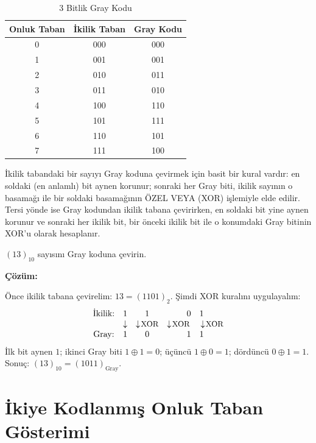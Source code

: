 \begin{table}[H]
\centering
\caption{3 Bitlik Gray Kodu}
\label{tab:gray-kodu}
\begin{tabular}{ccc}
\toprule
\textbf{Onluk Taban} & \textbf{İkilik Taban} & \textbf{Gray Kodu} \\
\midrule
0 & 000 & 000 \\
1 & 001 & 001 \\
2 & 010 & 011 \\
3 & 011 & 010 \\
4 & 100 & 110 \\
5 & 101 & 111 \\
6 & 110 & 101 \\
7 & 111 & 100 \\
\bottomrule
\end{tabular}
\end{table}

İkilik tabandaki bir sayıyı Gray koduna çevirmek için basit bir kural vardır: en soldaki (en anlamlı) bit aynen korunur; sonraki her Gray biti, ikilik sayının o basamağı ile bir soldaki basamağının ÖZEL VEYA (XOR) işlemiyle elde edilir. Tersi yönde ise Gray kodundan ikilik tabana çevirirken, en soldaki bit yine aynen korunur ve sonraki her ikilik bit, bir önceki ikilik bit ile o konumdaki Gray bitinin XOR'u olarak hesaplanır.

\begin{ornek}[A.21]
$(13)_{10}$ sayısını Gray koduna çevirin.

\textbf{Çözüm:}

Önce ikilik tabana çevirelim: $13 = (1101)_2$. Şimdi XOR kuralını uygulayalım:
\[
\begin{array}{cccc}
\text{İkilik:} & 1 & 1 & 0 \quad 1 \\
& \downarrow & \downarrow\!\!\text{\small\,XOR} & \downarrow\!\!\text{\small\,XOR} \quad \downarrow\!\!\text{\small\,XOR} \\
\text{Gray:} & 1 & 0 & 1 \quad 1
\end{array}
\]
İlk bit aynen $1$; ikinci Gray biti $1 \oplus 1 = 0$; üçüncü $1 \oplus 0 = 1$; dördüncü $0 \oplus 1 = 1$. Sonuç: $(13)_{10} = (1011)_{\text{Gray}}$.
\end{ornek}


\section{İkiye Kodlanmış Onluk Taban Gösterimi}
\label{sec:bcd}

